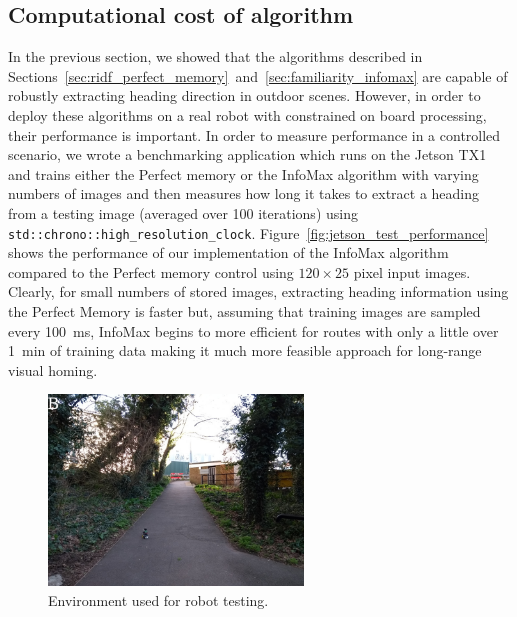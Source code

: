 \documentclass[letterpaper]{article}
\begin{document}
\subsection{Computational cost of algorithm}
In the previous section, we showed that the algorithms described in Sections~\ref{sec:ridf_perfect_memory}~and~\ref{sec:familiarity_infomax} are capable of robustly extracting heading direction in outdoor scenes. 
However, in order to deploy these algorithms on a real robot with constrained on board processing, their performance is important. 
In order to measure performance in a controlled scenario, we wrote a benchmarking application which runs on the Jetson TX1 and trains either the Perfect memory or the InfoMax algorithm with varying numbers of images and then measures how long it takes to extract a heading from a testing image (averaged over \num{100} iterations) using \lstinline{std::chrono::high_resolution_clock}.
Figure~\ref{fig:jetson_test_performance} shows the performance of our implementation of the InfoMax algorithm compared to the Perfect memory control using $120 \times 25$ pixel input images.
Clearly, for small numbers of stored images, extracting heading information using the Perfect Memory is faster but, assuming that training images are sampled every \SI{100}{\milli\second}, InfoMax begins to more efficient for routes with only a little over \SI{1}{\minute} of training data making it much more feasible approach for long-range visual homing.

\begin{figure}[t]
    \centering
    \includegraphics[height=2in]{figures/robot_environment.jpg}
    \caption{Environment used for robot testing.}
    \label{fig:robot_environment}
\end{figure}
\end{document}
